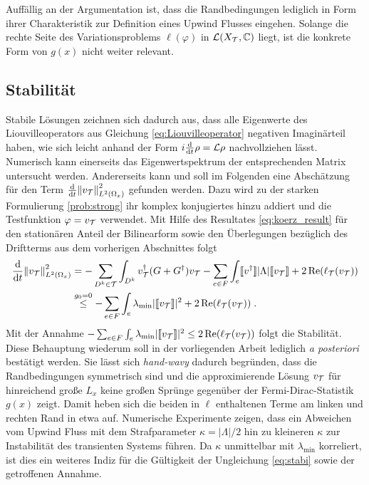 Auffällig an der Argumentation ist, dass die Randbedingungen lediglich in Form ihrer Charakteristik zur Definition eines Upwind Flusses eingehen. Solange die rechte Seite des Variationsproblems $\ell(\varphi)$ in $\mathcal{L}(X_{\mathcal{T}},\mathbb{C})$ liegt, ist die konkrete Form von $g(x)$ nicht weiter relevant.

\subsection{Stabilität}\label{sec:stabilität}
Stabile Lösungen zeichnen sich dadurch aus, dass alle Eigenwerte des Liouvilleoperators aus Gleichung \eqref{eq:Liouvilleoperator} negativen Imaginärteil haben, wie sich leicht anhand der Form $i\frac{\mathrm{d}}{\mathrm{d}t}\rho = \mathcal{L}\rho$ nachvollziehen lässt. Numerisch kann einerseits das Eigenwertspektrum der entsprechenden Matrix untersucht werden. Andererseits kann und soll im Folgenden eine Abschätzung für den Term $\frac{\mathrm{d}}{\mathrm{d}t}\norm{v_{\mathcal{T}}}_{L^2(\Omega_x)}^2$ gefunden werden. Dazu wird zu der starken Formulierung \ref{prob:strong} ihr komplex konjugiertes hinzu addiert und die Testfunktion $\varphi=v_{\mathcal{T}}$ verwendet. Mit Hilfe des Resultates \eqref{eq:koerz_result} für den stationären Anteil der Bilinearform sowie den Überlegungen bezüglich des Driftterms aus dem vorherigen Abschnittes folgt
\begin{align}
  \frac{\mathrm{d}}{\mathrm{d}t}\norm{v_{\mathcal{T}}}_{L^2(\Omega_x)}^2
  &= - \sum_{D^k \in \mathcal{T}} \int_{D^k} v_{\mathcal{T}}^{\dagger}(G+G^{\dagger})v_{\mathcal{T}}
  - \sum_{e\in F}\int_e  \llbracket v^{\dagger} \rrbracket |\Lambda| \llbracket v_{\mathcal{T}} \rrbracket
  + 2\operatorname{Re}(\ell_{\mathcal{T}}(v_{\mathcal{T}})) \nonumber \\
 &\stackrel{g_0=0}{\leq} -  \sum_{e\in F}\int_e \lambda_{\text{min}}  |\llbracket v_{\mathcal{T}} \rrbracket|^2
       + 2\operatorname{Re}(\ell_{\mathcal{T}}(v_{\mathcal{T}})) \label{eq:stabi} \; .
\end{align}
Mit der Annahme $-  \sum_{e\in F}\int_e \lambda_{\text{min}}  |\llbracket v_{\mathcal{T}} \rrbracket|^2  \leq 2\operatorname{Re}(\ell_{\mathcal{T}}(v_{\mathcal{T}}))$ folgt die Stabilität. Diese Behauptung wiederum soll in der vorliegenden Arbeit lediglich \emph{a posteriori} bestätigt werden. Sie lässt sich \emph{hand-wavy} dadurch begründen, dass die Randbedingungen symmetrisch sind und die approximierende Lösung $v_{\mathcal{T}}$ für hinreichend große $L_x$ keine großen Sprünge gegenüber der Fermi-Dirac-Statistik $g(x)$ zeigt. Damit heben sich die beiden in $\ell$ enthaltenen Terme am linken und rechten Rand in etwa auf.
Numerische Experimente zeigen, dass ein Abweichen vom Upwind Fluss mit dem Strafparameter $\kappa=|\Lambda|/2$ hin zu kleineren $\kappa$ zur Instabilität des transienten Systems führen. Da $\kappa$ unmittelbar mit $\lambda_{\text{min}}$ korreliert, ist dies ein weiteres Indiz für die Gültigkeit der Ungleichung \eqref{eq:stabi} sowie der getroffenen Annahme.

